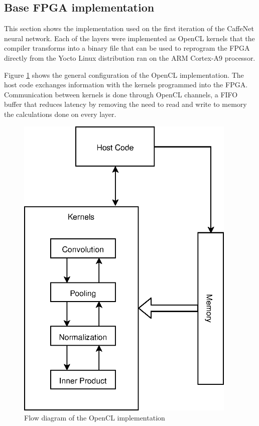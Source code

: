 \begin{enumerate}
\subsection{Base FPGA implementation}

This section shows the implementation used on the first iteration of the CaffeNet neural network.
Each of the layers were implemented as OpenCL kernels that the compiler transforms into a binary
file that can be used to reprogram the FPGA directly from the Yocto Linux distribution ran
on the ARM Cortex-A9 processor.

Figure \ref{fig:projectDiagram} shows the general configuration of the OpenCL implementation.
The host code exchanges information with the kernels programmed into the FPGA.
Communication between kernels is done through OpenCL channels, a FIFO buffer that reduces
latency by removing the need to read and write to memory the calculations done
on every layer.

\begin{figure}[H]
    \centering
    \includegraphics[height=15cm]{fig/projectDiagram.eps}
    \caption{Flow diagram of the OpenCL implementation}
    \label{fig:projectDiagram}
\end{figure}


\end{enumerate}
